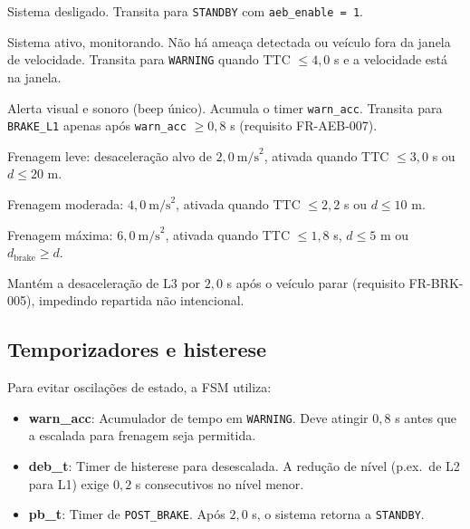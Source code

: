 \documentclass[12pt,a4paper]{article}
\begin{document}
\begin{description}[style=nextline]
    \item[\texttt{OFF (0)}]
        Sistema desligado. Transita para \texttt{STANDBY} com
        \texttt{aeb\_enable = 1}.
    \item[\texttt{STANDBY (1)}]
        Sistema ativo, monitorando. Não há ameaça detectada ou veículo fora
        da janela de velocidade. Transita para \texttt{WARNING} quando
        TTC $\leq 4{,}0$ s e a velocidade está na janela.
    \item[\texttt{WARNING (2)}]
        Alerta visual e sonoro (beep único). Acumula o timer
        \texttt{warn\_acc}. Transita para \texttt{BRAKE\_L1} apenas após
        \texttt{warn\_acc} $\geq 0{,}8$ s (requisito FR-AEB-007).
    \item[\texttt{BRAKE\_L1 (3)}]
        Frenagem leve: desaceleração alvo de $2{,}0\ \text{m/s}^2$, ativada
        quando TTC $\leq 3{,}0$ s ou $d \leq 20$ m.
    \item[\texttt{BRAKE\_L2 (4)}]
        Frenagem moderada: $4{,}0\ \text{m/s}^2$, ativada quando TTC $\leq
        2{,}2$ s ou $d \leq 10$ m.
    \item[\texttt{BRAKE\_L3 (5)}]
        Frenagem máxima: $6{,}0\ \text{m/s}^2$, ativada quando TTC $\leq
        1{,}8$ s, $d \leq 5$ m ou $d_{\text{brake}} \geq d$.
    \item[\texttt{POST\_BRAKE (6)}]
        Mantém a desaceleração de L3 por $2{,}0$ s após o veículo parar
        (requisito FR-BRK-005), impedindo repartida não intencional.
\end{description}

\subsection{Temporizadores e histerese}

Para evitar oscilações de estado, a FSM utiliza:

\begin{itemize}[noitemsep]
    \item \textbf{warn\_acc}: Acumulador de tempo em \texttt{WARNING}. Deve
          atingir $0{,}8$ s antes que a escalada para frenagem seja permitida.
    \item \textbf{deb\_t}: Timer de histerese para desescalada. A redução de
          nível (p.ex.\ de L2 para L1) exige $0{,}2$ s consecutivos no nível
          menor.
    \item \textbf{pb\_t}: Timer de \texttt{POST\_BRAKE}. Após $2{,}0$ s, o
          sistema retorna a \texttt{STANDBY}.
\end{itemize}
\end{document}
